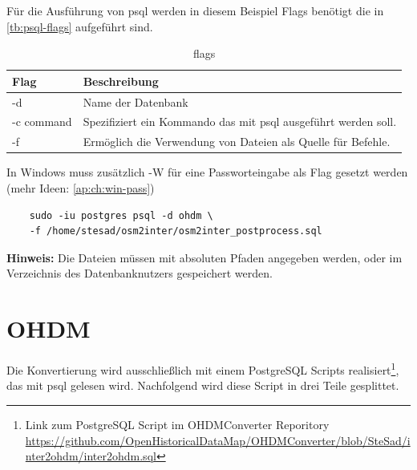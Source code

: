 Für die Ausführung von psql werden in diesem Beispiel Flags benötigt die in \autoref{tb:psql-flags} aufgeführt sind.
\begin{table}[h]
	\caption{flags}
	\label{tb:psql-flags}
	\renewcommand{\arraystretch}{1.5}
	\begin{tabularx}{\linewidth}{|l|X|}\hline
		Flag & Beschreibung\\\hline
		-d & Name der Datenbank \\\hline
		-c command & Spezifiziert ein Kommando das mit psql ausgeführt werden soll. \\\hline
		-f & Ermöglich die Verwendung von Dateien als Quelle für Befehle.\\\hline
	\end{tabularx}\vspace{0.5cm}
	In Windows muss zusätzlich -W für eine Passworteingabe als Flag gesetzt werden \\(mehr Ideen: \autoref{ap:ch:win-pass})
\end{table}
\begin{lstlisting}
	sudo -iu postgres psql -d ohdm \
	-f /home/stesad/osm2inter/osm2inter_postprocess.sql
\end{lstlisting}
\textbf{Hinweis:} Die Dateien müssen mit absoluten Pfaden angegeben werden, oder im Verzeichnis des Datenbanknutzers gespeichert werden.\\

\chapter{OHDM}
Die Konvertierung wird ausschließlich mit einem PostgreSQL Scripts realisiert\footnote{Link zum PostgreSQL Script im OHDMConverter Reporitory\\ \url{https://github.com/OpenHistoricalDataMap/OHDMConverter/blob/SteSad/inter2ohdm/inter2ohdm.sql}}, das mit psql\cite{postgres-psql} gelesen wird. Nachfolgend wird diese Script in drei Teile gesplittet.

